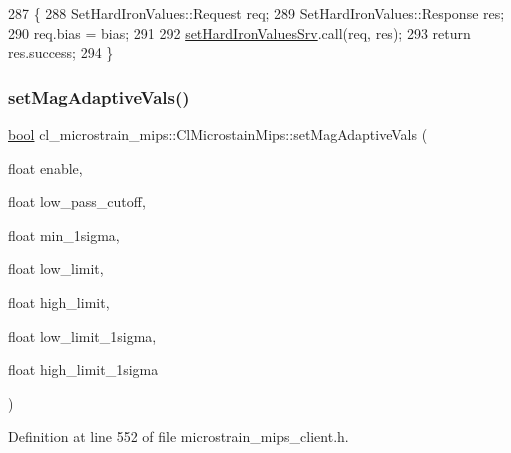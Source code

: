 \begin{DoxyCode}
287     \{
288         SetHardIronValues::Request req;
289         SetHardIronValues::Response res;
290         req.bias = bias;
291 
292         \hyperlink{classcl__microstrain__mips_1_1ClMicrostainMips_abab500a095515c133d5edfea23736fad}{setHardIronValuesSrv}.call(req, res);
293         \textcolor{keywordflow}{return} res.success;
294     \}
\end{DoxyCode}
\mbox{\label{classcl__microstrain__mips_1_1ClMicrostainMips_ad28163dc7afc33064b337f6a76b99389}} 
\subsubsection{\texorpdfstring{set\+Mag\+Adaptive\+Vals()}{setMagAdaptiveVals()}}
{\footnotesize\ttfamily \hyperlink{classbool}{bool} cl\+\_\+microstrain\+\_\+mips\+::\+Cl\+Microstain\+Mips\+::set\+Mag\+Adaptive\+Vals (\begin{DoxyParamCaption}\item[{float}]{enable,  }\item[{float}]{low\+\_\+pass\+\_\+cutoff,  }\item[{float}]{min\+\_\+1sigma,  }\item[{float}]{low\+\_\+limit,  }\item[{float}]{high\+\_\+limit,  }\item[{float}]{low\+\_\+limit\+\_\+1sigma,  }\item[{float}]{high\+\_\+limit\+\_\+1sigma }\end{DoxyParamCaption})\hspace{0.3cm}{\ttfamily [inline]}}



Definition at line 552 of file microstrain\+\_\+mips\+\_\+client.\+h.


